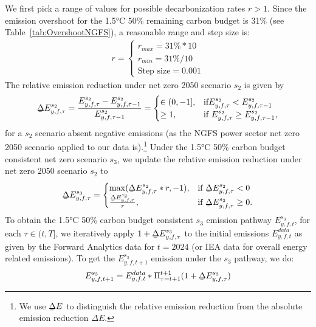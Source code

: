 \documentclass[11pt,a4paper,table,xcdraw]{article}
\newcommand{\ubar}[1]{\underaccent{\bar}{#1}}
\begin{document}
\noindent We first pick a range of values for possible decarbonization rates $r>1$. Since the emission overshoot for the 1.5°C 50\% remaining carbon budget is 31\% (see Table~\ref{tab:OvershootNGFS}), a reasonable range and step size is:
\begin{align}
    r = 
    \begin{cases}
    r_{max} = 31\% * 10\\
    r_{min} = 31\% / 10\\
    \text{Step size} = 0.001
    \end{cases}
\end{align}
The relative emission reduction under net zero 2050 scenario $s_2$ is given by
\begin{equation}
     \ubar{\Delta} E^{s_2}_{y,f,\tau} = \frac{E^{s_2}_{y,f,\tau}-E^{s_2}_{y,f,\tau-1}}{E^{s_2}_{y,f,\tau-1}}= 
 \begin{cases}
   \in (0,-1], & \text{if}  E^{s_2}_{y,f,\tau}<E^{s_2}_{y,f,\tau-1}  \\
    \geq 1, & \text{if }  E^{s_2}_{y,f,\tau}\geq E^{s_2}_{y,f,\tau-1}, \label{eq:EmissionReductionRelatives2}
\end{cases}  
\end{equation}
for a $s_2$ scenario absent negative emissions (as the NGFS power sector net zero 2050 scenario applied to our data is).\footnote{We use $\ubar{\Delta} E$ to distinguish the relative emission reduction from the absolute emission reduction $\Delta E$.} Under the 1.5°C 50\% carbon budget consistent net zero scenario $s_3$, we update the relative emission reduction under net zero 2050 scenario $s_2$ to
\begin{equation}
    \ubar{\Delta} E^{s_{3}}_{y,f,\tau} =
    \begin{cases}
    \max( \ubar{\Delta} E^{s_{2}}_{y,f,\tau} * r, -1), & \text{if }    \ubar{\Delta} E^{s_{2}}_{y,f,\tau}  < 0 \\
    \frac{ \ubar{\Delta} E^{s_{2}}_{y,f,\tau}}{r}, & \text{if }   \ubar{\Delta} E^{s_{2}}_{y,f,\tau}  \geq 0.
\end{cases}
\end{equation}
To obtain the 1.5°C 50\% carbon budget consistent $s_3$ emission pathway $E^{s_3}_{y,f,t}$, for each $\tau \in (t,T]$, we iteratively apply $1+ \ubar{\Delta} E^{s_{3}}_{y,f,\tau}$ to the initial emissions $E^{data}_{y,f,t}$ as given by the Forward Analytics data for $t=2024$ (or IEA data for overall energy related emissions). To get the $E^{s_3}_{y,f,t+1}$ emission under the $s_3$ pathway, we do:
\begin{equation}
    E^{s_3}_{y,f,t+1} = E^{data}_{y,f,t} * \Pi_{\tau=t+1}^{t+1} (1+ \ubar{\Delta} E^{s_{3}}_{y,f,\tau})
\end{equation}
\end{document}
